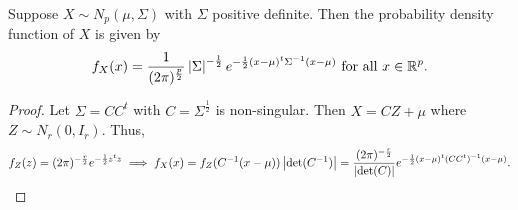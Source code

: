 \begin{theorem}
    Suppose $X \sim N_{p}(\mu,\Sigma)$ with $\Sigma$ positive definite. Then the probability density function of $X$ is given by
    \begin{align}
        f_{X}(x) = \frac{1}{(2\pi)^{\frac{p}{2}}} \left| \Sigma \right|^{-\frac{1}{2}} e^{-\frac{1}{2}(x-\mu)^{t}\Sigma^{-1}(x-\mu)} \text{ for all } x \in \mathbb{R}^{p}.
    \end{align}
\end{theorem}
\begin{proof}
    Let $\Sigma = CC^{t}$ with $C = \Sigma^{\frac{1}{2}}$ is non-singular. Then $X = CZ+\mu$ where $Z \sim N_{r}(0,I_{r})$. Thus,
    \begin{align}
        f_{Z}(z) = (2\pi)^{-\frac{r}{2}} e^{-\frac{1}{2}z^{t}z} \implies f_{X}(x) = f_{Z}(C^{-1}(x-\mu))\left| \det(C^{-1}) \right| = \frac{(2\pi)^{-\frac{r}{2}}}{\left| \det(C) \right|} e^{-\frac{1}{2}(x-\mu)^{t}(CC^{t})^{-1}(x-\mu)}.
    \end{align}
\end{proof}

